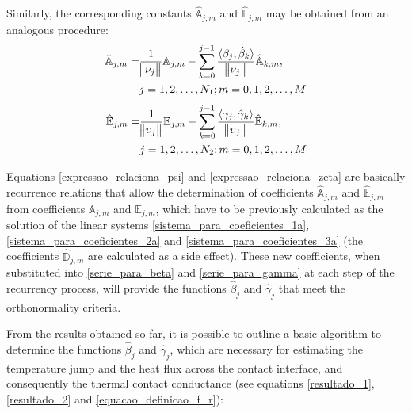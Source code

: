 \documentclass[conference,compsoc,fleqn]{IEEEtran}
\begin{document}
Similarly, the corresponding constants $\hat{\mathbb{A}}_{j,m}$ and $\hat{\mathbb{E}}_{j,m}$ may be obtained from an analogous procedure:
\begin{align}
\hat{\mathbb{A}}_{j,m} = & \frac{1}{\norm{\nu_j}} \mathbb{A}_{j,m} - \sum_{k=0}^{j-1} \frac{\langle \beta_j, \hat{\beta}_k \rangle}{\norm{\nu_j}} \hat{\mathbb{A}}_{k,m}
\label{expressao_relaciona_psi} , \nonumber \\
& j=1,2,\dots, N_1; m=0,1,2,\ldots,M
\end{align}
\begin{align}
\hat{\mathbb{E}}_{j,m} = & \frac{1}{\norm{\upsilon_j}} \mathbb{E}_{j,m} - \sum_{k=0}^{j-1} \frac{\langle \gamma_j, \hat{\gamma}_k \rangle}{\norm{\upsilon_j}} \hat{\mathbb{E}}_{k,m}
\label{expressao_relaciona_zeta} , \nonumber \\
& j=1,2,\dots, N_2 ; m=0,1,2,\ldots,M  
\end{align}

Equations \eqref{expressao_relaciona_psi} and \eqref{expressao_relaciona_zeta} are basically recurrence relations that allow the determination of coefficients $\hat{\mathbb{A}}_{j,m}$ and $\hat{\mathbb{E}}_{j,m}$ from coefficients $\mathbb{A}_{j,m}$ and $\mathbb{E}_{j,m}$, which have to be previously calculated as the solution of the linear systems \eqref{sistema_para_coeficientes_1a}, \eqref{sistema_para_coeficientes_2a} and \eqref{sistema_para_coeficientes_3a} (the coefficients $\hat{\mathbb{D}}_{j,m}$ are calculated as a side effect). These new coefficients, when substituted into \eqref{serie_para_beta} and \eqref{serie_para_gamma} at each step of the recurrency process, will provide the functions $\hat{\beta}_j$ and $\hat{\gamma}_j$ that meet the orthonormality criteria. 

From the results obtained so far, it is possible to outline a basic algorithm to determine the functions $\hat{\beta}_j$ and $\hat{\gamma}_j$, which are necessary for estimating the temperature jump and the heat flux across the contact interface, and consequently the thermal contact conductance (see equations \ref{resultado_1}, \ref{resultado_2} and \ref{equacao_definicao_f_r}): 
\end{document}
